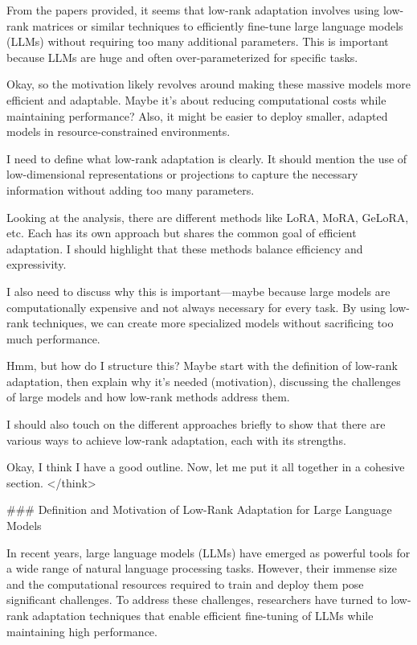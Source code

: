 \documentclass[conference]{IEEEtran}
\begin{document}
From the papers provided, it seems that low-rank adaptation involves using low-rank matrices or similar techniques to efficiently fine-tune large language models (LLMs) without requiring too many additional parameters. This is important because LLMs are huge and often over-parameterized for specific tasks.

Okay, so the motivation likely revolves around making these massive models more efficient and adaptable. Maybe it's about reducing computational costs while maintaining performance? Also, it might be easier to deploy smaller, adapted models in resource-constrained environments.

I need to define what low-rank adaptation is clearly. It should mention the use of low-dimensional representations or projections to capture the necessary information without adding too many parameters.

Looking at the analysis, there are different methods like LoRA, MoRA, GeLoRA, etc. Each has its own approach but shares the common goal of efficient adaptation. I should highlight that these methods balance efficiency and expressivity.

I also need to discuss why this is important—maybe because large models are computationally expensive and not always necessary for every task. By using low-rank techniques, we can create more specialized models without sacrificing too much performance.

Hmm, but how do I structure this? Maybe start with the definition of low-rank adaptation, then explain why it's needed (motivation), discussing the challenges of large models and how low-rank methods address them.

I should also touch on the different approaches briefly to show that there are various ways to achieve low-rank adaptation, each with its strengths.

Okay, I think I have a good outline. Now, let me put it all together in a cohesive section.
</think>

### Definition and Motivation of Low-Rank Adaptation for Large Language Models

In recent years, large language models (LLMs) have emerged as powerful tools for a wide range of natural language processing tasks. However, their immense size and the computational resources required to train and deploy them pose significant challenges. To address these challenges, researchers have turned to low-rank adaptation techniques that enable efficient fine-tuning of LLMs while maintaining high performance.
\end{document}
